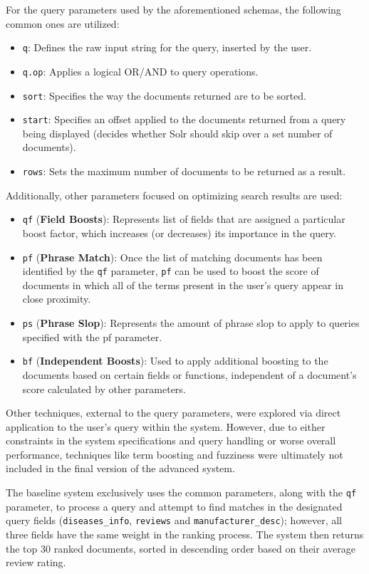 \documentclass[sigconf]{acmart}
\begin{document}
For the query parameters used by the aforementioned schemas, the following common ones are utilized:
\begin{itemize}
    \item \texttt{q}: Defines the raw input string for the query, inserted by the user.
    \item \texttt{q.op}: Applies a logical OR/AND to query operations.
    \item \texttt{sort}: Specifies the way the documents returned are to be sorted.
    \item \texttt{start}: Specifies an offset applied to the documents returned from a query being displayed (decides whether Solr should skip over a set number of documents).
    \item \texttt{rows}: Sets the maximum number of documents to be returned as a result.
\end{itemize}

Additionally, other parameters focused on optimizing search results are used:
\begin{itemize}
    \item \texttt{qf} (\textbf{Field Boosts}): Represents list of fields that are assigned a particular boost factor, which increases (or decreases) its importance in the query.
    \item \texttt{pf} (\textbf{Phrase Match}): Once the list of matching documents has been identified by the \texttt{qf} parameter, \texttt{pf} can be used to boost the score of documents in which all of the terms present in the user's query appear in close proximity.
    \item \texttt{ps} (\textbf{Phrase Slop}): Represents the amount of phrase slop\cite{slop} to apply to queries specified with the pf parameter.
    \item \texttt{bf} (\textbf{Independent Boosts}): Used to apply additional boosting to the documents based on certain fields or functions, independent of a document's score calculated by other parameters.
\end{itemize}

Other techniques, external to the query parameters, were explored via direct application to the user's query within the system. However, due to either constraints in the system specifications and query handling or worse overall performance, techniques like term boosting\cite{termboosting} and fuzziness\cite{fuzziness} were ultimately not included in the final version of the advanced system.

The baseline system exclusively uses the common parameters, along with the \texttt{qf} parameter, to process a query and attempt to find matches in the designated query fields (\texttt{diseases\_info}, \texttt{reviews} and \texttt{manufacturer\_desc}); however, all three fields have the same weight in the ranking process. The system then returns the top 30 ranked documents, sorted in descending order based on their average review rating.
\end{document}
